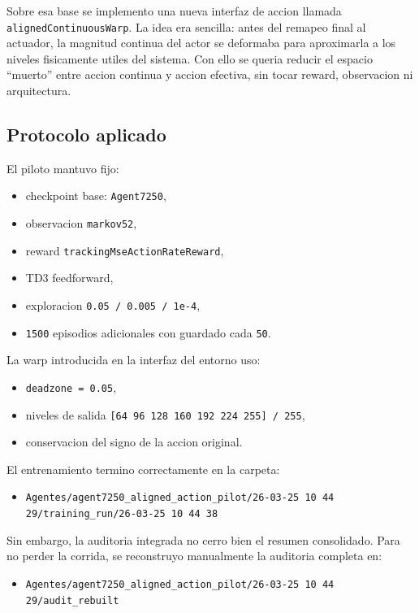\documentclass[11pt,a4paper]{article}
\begin{document}
Sobre esa base se implemento una nueva interfaz de accion llamada \texttt{alignedContinuousWarp}. La idea era sencilla: antes del remapeo final al actuador, la magnitud continua del actor se deformaba para aproximarla a los niveles fisicamente utiles del sistema. Con ello se queria reducir el espacio ``muerto'' entre accion continua y accion efectiva, sin tocar reward, observacion ni arquitectura.

\subsection{Protocolo aplicado}

El piloto mantuvo fijo:

\begin{itemize}
\item checkpoint base: \texttt{Agent7250},
\item observacion \texttt{markov52},
\item reward \texttt{trackingMseActionRateReward},
\item TD3 feedforward,
\item exploracion \texttt{0.05 / 0.005 / 1e-4},
\item \texttt{1500} episodios adicionales con guardado cada \texttt{50}.
\end{itemize}

La warp introducida en la interfaz del entorno uso:

\begin{itemize}
\item \texttt{deadzone = 0.05},
\item niveles de salida \texttt{[64 96 128 160 192 224 255] / 255},
\item conservacion del signo de la accion original.
\end{itemize}

El entrenamiento termino correctamente en la carpeta:

\begin{itemize}
\item \texttt{Agentes/agent7250\_aligned\_action\_pilot/26-03-25 10 44 29/training\_run/26-03-25 10 44 38}
\end{itemize}

Sin embargo, la auditoria integrada no cerro bien el resumen consolidado. Para no perder la corrida, se reconstruyo manualmente la auditoria completa en:

\begin{itemize}
\item \texttt{Agentes/agent7250\_aligned\_action\_pilot/26-03-25 10 44 29/audit\_rebuilt}
\end{itemize}
\end{document}
